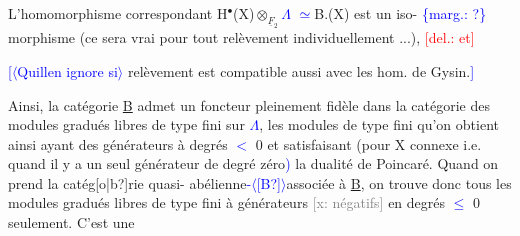 \documentclass[11pt]{article}
\newcommand{\mspage}[1]{{\small\sffamily[p.\,#1]}}
\newcommand{\hand}[1]{\textcolor{blue}{#1}}
\let\over\relax
\newcommand{\over}[2]{\textcolor{gray}{#1}\textcolor{blue}{\ensuremath{^{\!\nearrow}}#2}}
\newcommand{\inserted}[2][]{\textcolor{blue}{$\langle$#2$\rangle$}}
\newcommand{\margin}[1]{\textcolor{blue}{\{\textsf{marg.:} #1\}}}
\newcommand{\deleted}[1]{\textcolor{red}{[\textsf{del.:} #1]}}
\newcommand{\xout}[1]{\textcolor{gray}{[\textsf{x:} #1]}}
\newcommand{\unsure}[1]{[#1?]}
\begin{document}
\over{a)}{\unsure{1)}} L'homomorphisme correspondant H$^\bullet$(X)$\otimes_{\underline{F}_2}$\hand{$\Lambda$} \hand{$\simeq$}B.(X) est un iso-%
\margin{?}
morphisme (ce sera vrai pour tout relèvement individuellement ...), \deleted{et}

\over{b)}{\unsure{2)}} \hand{[}\inserted{Quillen ignore si} \over{Le\xout{x}}{\unsure{le}} relèvement est compatible aussi avec les hom. de Gysin.\hand{]}

Ainsi, la catégorie \underline{B} admet un foncteur pleinement fidèle dans la
catégorie des modules gradués libres de type fini sur \hand{$\Lambda$}, les modules
de type fini qu'on obtient ainsi ayant des générateurs à degrés \hand{$<$} 0 et
satisfaisant (pour X connexe i.e. quand il y a un seul générateur de
degré zéro\hand{)} la dualité de Poincaré. Quand on prend la catég\unsure{o|b}rie quasi-%
abélienne\hand{-}\inserted{\unsure{B}}associée à \underline{B}, on trouve donc tous les modules gradués libres
de type fini à générateurs \xout{négatifs} en degrés \hand{$\leq$} 0 seulement. C'est une

\mspage{45}
\end{document}
